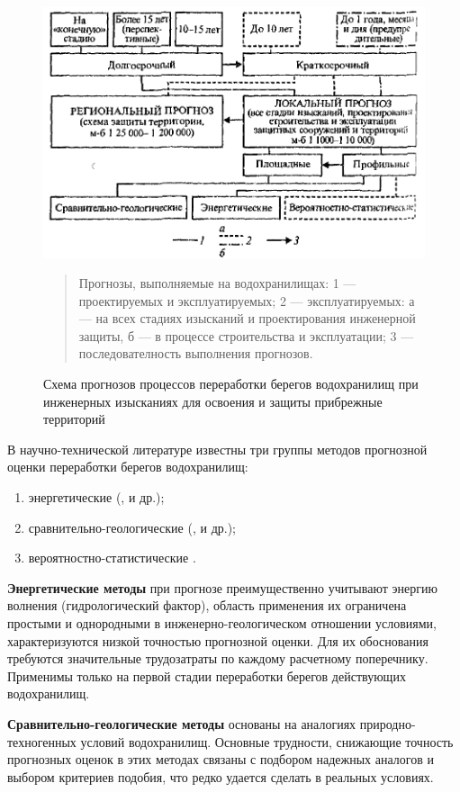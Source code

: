 \documentclass[732,fontsize=14pt,final]{studrep}
\begin{document}
  \begin{figure}[htp]
	\begin{center}
	\includegraphics[width=0.8\linewidth]{pics/image4.png}
  \end{center}
  \begin{quote}  
    Прогнозы, выполняемые на водохранилищах: 1 — проектируемых и эксплуатируемых; 2 — эксплуатируемых: а — на всех стадиях изысканий и проектирования инженерной защиты, б — в процессе строительства и эксплуатации; 3 — последователность выполнения прогнозов.
  \end{quote}
  \caption{Схема прогнозов процессов переработки берегов водохранилищ при инженерных изысканиях для освоения и защиты прибрежные территорий~\cite{rec86}}
    \label{fig:prognosys-schema}
  \end{figure}

В научно-технической литературе известны три группы методов прогнозной оценки переработки берегов водохранилищ:
\begin{enumerate}
\item энергетические (\cite{b22}, \cite{b23} и др.);
\item сравнительно-геологические (\cite{b18}, \cite{b19} и др.);
\item вероятностно-статистические \cite{b20}.
\end{enumerate}

\textbf{Энергетические методы} при прогнозе преимущественно учитывают энергию волнения (гидрологический фактор), область применения их ограничена простыми и однородными в инженерно-геологическом отношении условиями, характеризуются низкой точностью прогнозной оценки. Для их обоснования требуются значительные трудозатраты по каждому расчетному поперечнику. Применимы только на первой стадии переработки берегов действующих водохранилищ.

\textbf{Сравнительно-геологические методы}  основаны на аналогиях природно-техногенных условий водохранилищ. Основные трудности, снижающие точность прогнозных оценок в этих методах связаны с подбором надежных аналогов и выбором критериев подобия, что редко удается сделать в реальных условиях.
\end{document}
